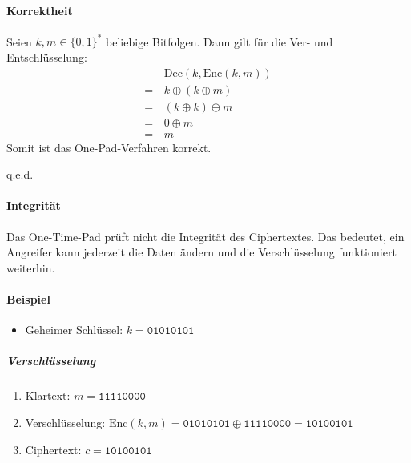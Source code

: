 \documentclass[a4paper, 11pt, accentcolor = tud3b]{tudreport}
\newcommand{\qed}{{\hfill q.e.d.}}
\newcommand{\Enc}{\ensuremath{\textrm{Enc}}}
\newcommand{\Dec}{\ensuremath{\textrm{Dec}}}
\begin{document}
                    \paragraph{Korrektheit}
	                    Seien \( k, m \in \{ 0, 1 \} ^ * \) beliebige Bitfolgen. Dann gilt für die Ver- und Entschlüsselung:
	                    \begin{align*}
		                      &\, \Dec(k, \Enc(k, m)) \\
		                    = &\, k \oplus (k \oplus m) \\
		                    = &\, (k \oplus k) \oplus m \tag{Assoziativität} \\
		                    = &\, 0 \oplus m \tag{XOR-Definition} \\
		                    = &\, m
	                    \end{align*}
	                    Somit ist das One-Pad-Verfahren korrekt.
	                    
	                    \qed
                    
                    \paragraph{Integrität}
	                    Das One-Time-Pad prüft nicht die Integrität des Ciphertextes. Das bedeutet, ein Angreifer kann jederzeit die Daten ändern und die Verschlüsselung funktioniert weiterhin.
                    
					\paragraph{Beispiel}
						\begin{itemize}
							\item Geheimer Schlüssel: \( k = \texttt{01010101} \)
						\end{itemize}
						
						\subparagraph{Verschlüsselung}
							\begin{enumerate}
								\item[] Klartext: \( m = \texttt{11110000} \)
								\item Verschlüsselung: \( \Enc(k, m) = \texttt{01010101} \oplus \texttt{11110000} = \texttt{10100101} \)
								\item[] Ciphertext: \( c = \texttt{10100101} \)
							\end{enumerate}
						
\end{document}

